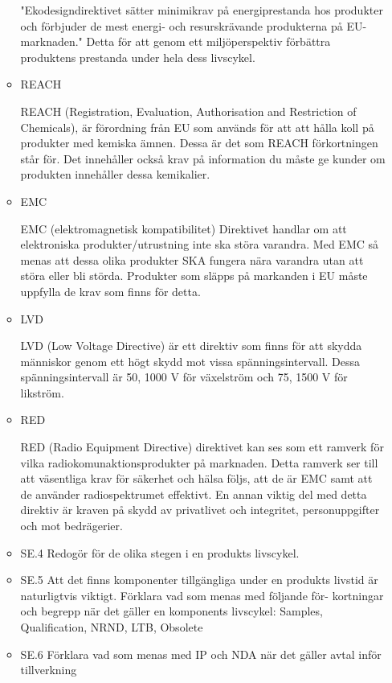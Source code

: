 \documentclass{article}
\begin{document}
\begin{itemize}
\begin{itemize}
                "Ekodesigndirektivet sätter minimikrav på energiprestanda hos produkter och förbjuder de mest energi- och resurskrävande produkterna på EU-marknaden." Detta för att genom ett miljöperspektiv förbättra produktens prestanda under hela dess livscykel.
            \item REACH
                
            REACH (Registration, Evaluation, Authorisation and Restriction of Chemicals), är förordning från EU som används för att att hålla koll på produkter med kemiska ämnen. Dessa är det som REACH förkortningen står för. Det innehåller också krav på information du måste ge kunder om produkten innehåller dessa kemikalier. 
            \item EMC

            EMC (elektromagnetisk kompatibilitet) Direktivet handlar om att elektroniska produkter/utrustning inte ska störa varandra. Med EMC så menas att dessa olika produkter SKA fungera nära varandra utan att störa eller bli störda. Produkter som släpps på markanden i EU måste uppfylla de krav som finns för detta.
            \item LVD

            LVD (Low Voltage Directive) är ett direktiv som finns för att skydda människor genom ett högt skydd mot vissa spänningsintervall. Dessa spänningsintervall är 50, 1000 V för växelström och 75, 1500 V för likström.
            \item RED

            RED (Radio Equipment Directive) direktivet kan ses som ett ramverk för vilka radiokomunaktionsprodukter på marknaden. Detta ramverk ser till att väsentliga krav för säkerhet och hälsa följs, att de är EMC samt att de använder radiospektrumet effektivt. En annan viktig del med detta direktiv är kraven på skydd av privatlivet och integritet, personuppgifter och mot bedrägerier.
    
    \item SE.4 Redogör för de olika stegen i en produkts livscykel.

        
        
    \item SE.5 Att det finns komponenter tillgängliga under en produkts livstid är naturligtvis viktigt. Förklara vad som menas med följande för- kortningar och begrepp när det gäller en komponents livscykel:
    Samples, Qualification, NRND, LTB, Obsolete
    \item SE.6 Förklara vad som menas med IP och NDA när det gäller avtal inför tillverkning        


\end{itemize}

\end{itemize}
\end{document}
